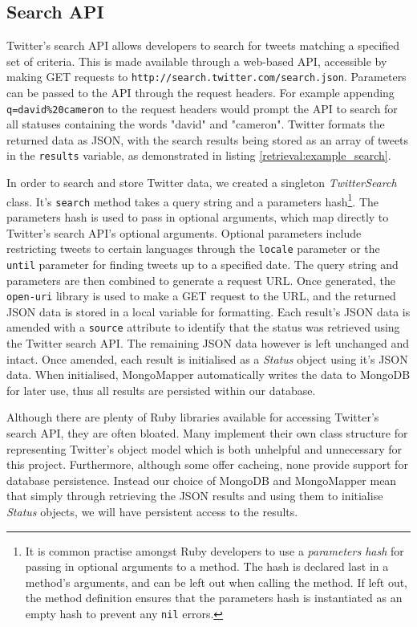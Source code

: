 \subsection{Search API}

Twitter's search API allows developers to search for tweets matching a specified set of criteria. This is made available through a web-based API, accessible by making GET requests to \texttt{http://\-search\-.\-twitter\-.\-com\-/\-search\-.\-json}. Parameters can be passed to the API through the request headers. For example appending \texttt{q=\-david\-\%20cameron} to the request headers would prompt the API to search for all statuses containing the words "david" and "cameron". Twitter formats the returned data as JSON, with the search results being stored as an array of tweets in the \texttt{results} variable, as demonstrated in listing \ref{retrieval:example_search}.

In order to search and store Twitter data, we created a singleton \emph{TwitterSearch} class. It's \texttt{search} method takes a query string and a parameters hash\footnote{It is common practise amongst Ruby developers to use a \emph{parameters hash} for passing in optional arguments to a method. The hash is declared last in a method's arguments, and can be left out when calling the method. If left out, the method definition ensures that the parameters hash is instantiated as an empty hash to prevent any \texttt{nil} errors.}. The parameters hash is used to pass in optional arguments, which map directly to Twitter's search API's optional arguments. Optional parameters include restricting tweets to certain languages through the \texttt{locale} parameter or the \texttt{until} parameter for finding tweets up to a specified date. The query string and parameters are then combined to generate a request URL. Once generated, the \texttt{open-uri} library is used to make a GET request to the URL, and the returned JSON data is stored in a local variable for formatting. Each result's JSON data is amended with a \texttt{source} attribute to identify that the status was retrieved using the Twitter search API. The remaining JSON data however is left unchanged and intact. Once amended, each result is initialised as a \emph{Status} object using it's JSON data. When initialised, MongoMapper automatically writes the data to MongoDB for later use, thus all results are persisted within our database.

Although there are plenty of Ruby libraries available for accessing Twitter's search API, they are often bloated. Many implement their own class structure for representing Twitter's object model which is both unhelpful and unnecessary for this project. Furthermore, although some offer cacheing, none provide support for database persistence. Instead our choice of MongoDB and MongoMapper mean that simply through retrieving the JSON results and using them to initialise \emph{Status} objects, we will have persistent access to the results. 

